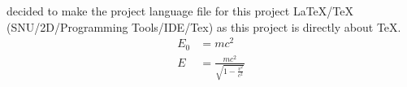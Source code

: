 \documentclass{article} %
\title{\ProjectLanguageFile} %
\begin{document}
  \maketitle
  \I decided to make the project language file for this project LaTeX/TeX (SNU/2D/Programming Tools/IDE/Tex) as this project is directly about TeX.
  \begin{align}
    E_0 &= mc^2 \\
    E &= \frac{mc^2}{\sqrt{1-\frac{v^2}{c^2}}}
  \end{align} 
\end{document}
